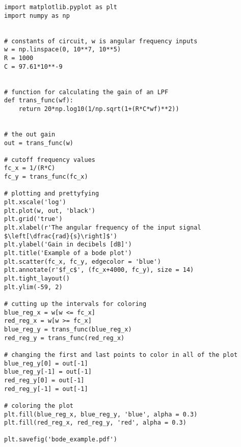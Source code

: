 \begin{verbatim}
import matplotlib.pyplot as plt
import numpy as np


# constants of circuit, w is angular frequency inputs
w = np.linspace(0, 10**7, 10**5)
R = 1000
C = 97.61*10**-9


# function for calculating the gain of an LPF
def trans_func(wf):
    return 20*np.log10(1/np.sqrt(1+(R*C*wf)**2))


# the out gain
out = trans_func(w)

# cutoff frequency values
fc_x = 1/(R*C)
fc_y = trans_func(fc_x)

# plotting and prettyfying
plt.xscale('log')
plt.plot(w, out, 'black')
plt.grid('true')
plt.xlabel(r'The angular frequency of the input signal $\left[\dfrac{rad}{s}\right]$')
plt.ylabel('Gain in decibels [dB]')
plt.title('Example of a bode plot')
plt.scatter(fc_x, fc_y, edgecolor = 'blue')
plt.annotate(r'$f_c$', (fc_x+4000, fc_y), size = 14)
plt.tight_layout()
plt.ylim(-59, 2)

# cutting up the intervals for coloring
blue_reg_x = w[w <= fc_x]
red_reg_x = w[w >= fc_x]
blue_reg_y = trans_func(blue_reg_x)
red_reg_y = trans_func(red_reg_x)

# changing the first and last points to color in all of the plot
blue_reg_y[0] = out[-1]
blue_reg_y[-1] = out[-1]
red_reg_y[0] = out[-1]
red_reg_y[-1] = out[-1]

# coloring the plot
plt.fill(blue_reg_x, blue_reg_y, 'blue', alpha = 0.3)
plt.fill(red_reg_x, red_reg_y, 'red', alpha = 0.3)

plt.savefig('bode_example.pdf')

\end{verbatim}